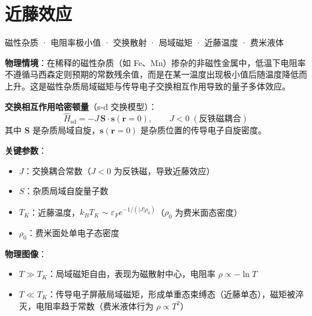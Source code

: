 
\section{近藤效应}
\label{sec:kondo-effect}

\begin{tipbox}[关键词标签]
磁性杂质 · 电阻率极小值 · 交换散射 · 局域磁矩 · 近藤温度 · 费米液体
\end{tipbox}

\begin{modelbox}[模型：近藤效应]
\textbf{物理情境}：在稀释的磁性杂质（如 Fe、Mn）掺杂的非磁性金属中，低温下电阻率不遵循马西森定则预期的常数残余值，而是在某一温度出现极小值后随温度降低而上升。这是磁性杂质局域磁矩与传导电子交换相互作用导致的量子多体效应。

\textbf{交换相互作用哈密顿量}（s-d 交换模型）：
\[
\hat{H}_{\text{sd}}=-J\,\mathbf{S}\cdot\mathbf{s}(\mathbf{r}=0),\qquad J<0\;(\text{反铁磁耦合})
\]
其中 $\mathbf{S}$ 是杂质局域自旋，$\mathbf{s}(\mathbf{r}=0)$ 是杂质位置的传导电子自旋密度。

\textbf{关键参数}：
\begin{itemize}[nosep]
    \item $J$：交换耦合常数（$J<0$ 为反铁磁，导致近藤效应）
    \item $S$：杂质局域自旋量子数
    \item $T_K$：近藤温度，$k_BT_K\sim\varepsilon_F e^{-1/(|J|\rho_0)}$（$\rho_0$ 为费米面态密度）
    \item $\rho_0$：费米面处单电子态密度
\end{itemize}

\textbf{物理图像}：
\begin{itemize}[nosep]
    \item $T\gg T_K$：局域磁矩自由，表现为磁散射中心，电阻率 $\rho\propto-\ln T$
    \item $T\ll T_K$：传导电子屏蔽局域磁矩，形成单重态束缚态（近藤单态），磁矩被淬灭，电阻率趋于常数（费米液体行为 $\rho\propto T^2$）
\end{itemize}
\end{modelbox}

